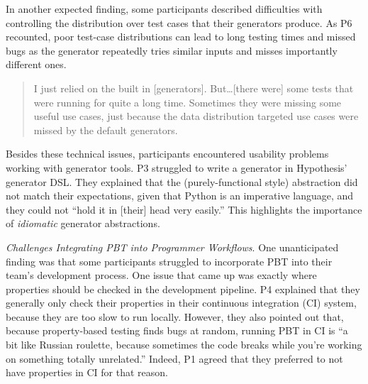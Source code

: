 In another expected finding, some participants described difficulties with
controlling the distribution over test cases that their generators produce.
As P6 recounted, poor test-case distributions can lead to long testing times and missed bugs
as the generator repeatedly tries similar inputs and misses importantly different ones.
\begin{quote}
  I just relied on the built in [generators]. But\dots [there were] some tests
  that were running for quite a long time. Sometimes they were missing some
  useful use cases, just because the data distribution targeted use cases were
  missed by the default generators.
\end{quote}

Besides these technical issues,
participants encountered usability problems working with generator tools. P3 struggled to
write a generator in Hypothesis' generator DSL. They
explained that the (purely-functional style) abstraction did not match their expectations, given that Python is an imperative language, and they could
not ``hold it in [their] head very easily.'' This highlights the importance of
{\em idiomatic} generator abstractions.

\textit{Challenges Integrating PBT into Programmer Workflows}.
One unanticipated finding was that some participants struggled to incorporate
PBT into their team's development process. One issue
that came up was exactly where properties should be checked in the development pipeline.
P4 explained that they generally only check their properties in their
continuous integration (CI) system, because they are too slow to run locally.
However, they also pointed out that, because property-based testing finds
bugs at random, running PBT in CI is ``a bit like
Russian roulette, because sometimes the code breaks while you're working on
something totally unrelated.'' Indeed, P1 agreed that they preferred
to not have properties in CI for that reason.

